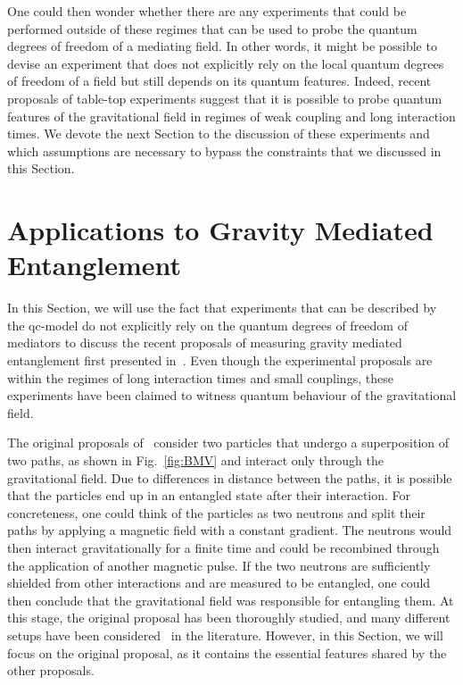 \documentclass[letterpaper,12pt,titlepage,oneside,final]{book}
\begin{document}
One could then wonder whether there are any experiments that could be performed outside of these regimes that can be used to probe the quantum degrees of freedom of a mediating field. In other words, it might be possible to devise an experiment that does not explicitly rely on the local quantum degrees of freedom of a field but still depends on its quantum features. Indeed, recent proposals of table-top experiments suggest that it is possible to probe quantum features of the gravitational field in regimes of weak coupling and long interaction times. We devote the next Section to the discussion of these experiments and which assumptions are necessary to bypass the constraints that we discussed in this Section.



\section{Applications to Gravity Mediated Entanglement}\label{sec:GME}

In this Section, we will use the fact that experiments that can be described by the qc-model do not explicitly rely on the quantum degrees of freedom of mediators to discuss the recent proposals of measuring gravity mediated entanglement first presented in~\cite{B,MV}. Even though the experimental proposals are within the regimes of long interaction times and small couplings, these experiments have been claimed to witness quantum behaviour of the gravitational field.

The original proposals of~\cite{B,MV} consider two particles that undergo a superposition of two paths, as shown in Fig.~\ref{fig:BMV} and interact only through the gravitational field. Due to differences in distance between the paths, it is possible that the particles end up in an entangled state after their interaction. For concreteness, one could think of the particles as two neutrons and split their paths by applying a magnetic field with a constant gradient. The neutrons would then interact gravitationally for a finite time and could be recombined through the application of another magnetic pulse. If the two neutrons are sufficiently shielded from other interactions and are measured to be entangled, one could then conclude that the gravitational field was responsible for entangling them. At this stage, the original proposal has been thoroughly studied, and many different setups have been considered~\cite{contBMVOG,contBMVJackson,contBMVBose} in the literature. However, in this Section, we will focus on the original proposal, as it contains the essential features shared by the other proposals.
\end{document}

